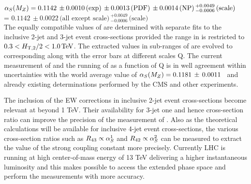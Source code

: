 $\alpha_S(M_Z) = 0.1142\,\pm0.0010\,\textrm{(exp)}\,\pm0.0013\,\textrm{(PDF)}\,\pm0.0014\,\textrm{(NP)}\,^{+0.0049}_{-0.0006}\,\textrm{(scale)}$ \\ \hspace*{24mm} = $0.1142\,\pm0.0022\,\textrm{(all except scale)}\,^{+0.0049}_{-0.0006}\,\textrm{(scale)}$\\ 
The equally compatible values of \alpsmz are determined with separate fits to the inclusive 2-jet and 3-jet event cross-sections provided the range in \httwo is restricted to $0.3 < H_{\mathrm{T,2}}/2 < 1.0\,\text{Te\hspace{-.08em}V}$. The extracted \alpsmz values in sub-ranges of \httwo are evolved to corresponding \alpsq along with the error bars at different scales Q. The current measurement of \alpsmz and the running of \alpsq as a function of Q is in well agreement within uncertainties with the world average value of $\alpha_S(M_Z) = 0.1181 \,\pm\, 0.0011$~\cite{Patrignani:2016xqp} and already existing determinations performed by the CMS and other experiments.

The inclusion of the EW corrections in inclusive 2-jet event cross-sections become relevant at \httwo beyond 1 TeV. Their availability for 3-jet one and hence cross-section ratio \ratio can improve the precision of the measurement of \alpsmz. Also as the theoretical calculations will be available for inclusive 4-jet event cross-sections, the various cross-section ratios such as $R_{\rm 43} \propto \alpha_S^1$ and $R_{\rm 42} \propto \alpha_S^2$ can be measured to extract the value of the strong coupling constant more precisely. Currently LHC is running at high center-of-mass energy of 13 TeV delivering a higher instantaneous luminosity and this makes possible to access the extended phase space and perform the measurements with more accuracy.
